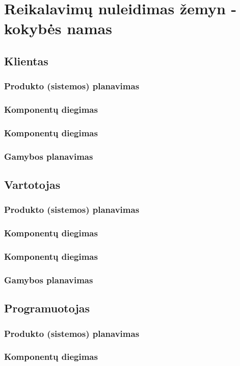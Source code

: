 \documentclass{VUMIFPSkursinis}
\begin{document}
\section{Reikalavimų nuleidimas žemyn - kokybės namas}
\subsection{Klientas}
\subsubsection{Produkto (sistemos) planavimas}
\subsubsection{Komponentų diegimas}
\subsubsection{Komponentų diegimas}
\subsubsection{Gamybos planavimas}
\subsection{Vartotojas}
\subsubsection{Produkto (sistemos) planavimas}
\subsubsection{Komponentų diegimas}
\subsubsection{Komponentų diegimas}
\subsubsection{Gamybos planavimas}
\subsection{Programuotojas}
\subsubsection{Produkto (sistemos) planavimas}
\subsubsection{Komponentų diegimas}
\end{document}

